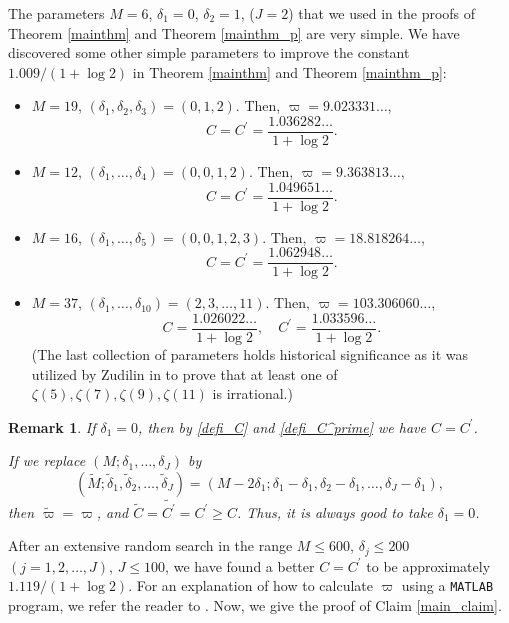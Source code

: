 \documentclass[12pt]{article}
\newtheorem{remark}[theorem]{Remark}
\numberwithin{equation}{section}
\begin{document}
The parameters $M=6$, $\delta_1 = 0$, $\delta_2 = 1$, ($J=2$) that we used in the proofs of Theorem \ref{mainthm} and Theorem \ref{mainthm_p} are very simple. We have discovered some other simple parameters to improve the constant $1.009/(1+\log 2)$ in Theorem \ref{mainthm} and Theorem \ref{mainthm_p}:
\begin{itemize}
\item $M=19$, $(\delta_1,\delta_2,\delta_3)=(0,1,2)$. Then, $\varpi = 9.023331\ldots$,  
\[ C = C^{\prime} = \frac{1.036282\ldots}{1+\log 2}. \]
\item $M=12$, $(\delta_1,\ldots,\delta_4)=(0,0,1,2)$. Then, $\varpi = 9.363813\ldots$, 
\[ C = C^{\prime} = \frac{1.049651\ldots}{1+\log 2}. \]
\item $M=16$, $(\delta_1,\ldots,\delta_5)=(0,0,1,2,3)$. Then, $\varpi=18.818264\ldots$, 
\[ C = C^{\prime} = \frac{1.062948\ldots}{1+\log 2}. \]
\item $M=37$, $(\delta_1,\ldots,\delta_{10})=(2,3,\ldots,11)$. 
Then, $\varpi = 103.306060\ldots$, 
 \[ C=\frac{1.026022\ldots}{1+\log 2}, \quad C^{\prime}= \frac{1.033596\ldots}{1+\log 2}.  \] 
(The last collection of parameters holds historical significance as it was utilized by Zudilin in \cite{Zud2001} to prove that at least one of $\zeta(5),\zeta(7),\zeta(9),\zeta(11)$ is irrational.)
\end{itemize} 

\bigskip

\begin{remark}
If $\delta_1 = 0$, then by \eqref{defi_C} and \eqref{defi_C^prime} we have $C=C^{\prime}$. 

If we replace $(M;\delta_1,\ldots,\delta_J)$ by \[(\widetilde{M};\widetilde{\delta}_1,\widetilde{\delta}_2,\ldots,\widetilde{\delta}_J) = (M-2\delta_1;\delta_1-\delta_1,\delta_2-\delta_1,\ldots,\delta_J-\delta_1),\] 
then $\widetilde{\varpi}=\varpi$, and $\widetilde{C}=\widetilde{C^\prime}=C^{\prime} \geqslant C$. Thus, it is always good to take $\delta_1 = 0$. 
\end{remark}

\bigskip

After an extensive random search in the range $M \leqslant 600$, $\delta_j \leqslant 200$ $(j=1,2,\ldots,J)$, $J \leqslant 100$, we have found a better $C = C^{\prime}$ to be approximately $1.119/(1+\log 2)$. For an explanation of how to calculate $\varpi$ using a \texttt{MATLAB} program, we refer the reader to \cite[Section 5]{LZ2022}. Now, we give the proof of Claim \ref{main_claim}.
\end{document}
